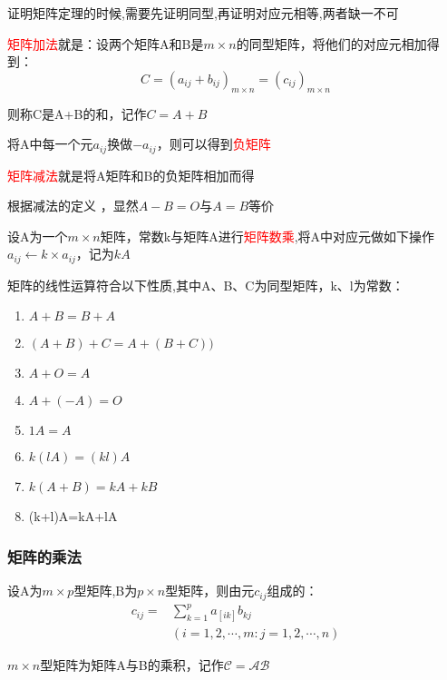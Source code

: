 \begin{note}
	证明矩阵定理的时候,需要先证明同型,再证明对应元相等,两者缺一不可
\end{note}

\begin{definition}
\textcolor{red}{矩阵加法}就是：设两个矩阵A和B是$m\times n$的同型矩阵，将他们的对应元相加得到：
\begin{equation*}
C=(a_{ij}+b_{ij})_{m\times n}=(c_{ij})_{m\times n}
\end{equation*}

则称C是A+B的和，记作$C=A+B$

\end{definition}

将A中每一个元$a_{ij}$换做$-a_{ij}$，则可以得到\textcolor{red}{负矩阵}

\textcolor{red}{矩阵减法}就是将A矩阵和B的负矩阵相加而得

根据减法的定义 ，显然$A-B=O$与$A=B$等价

\begin{definition}
	设A为一个$m\times n$矩阵，常数k与矩阵A进行\textcolor{red}{矩阵数乘},将A中对应元做如下操作$a_{ij}\leftarrow k\times a_{ij}$，记为$kA$
\end{definition}

矩阵的线性运算符合以下性质,其中A、B、C为同型矩阵，k、l为常数：

\begin{enumerate}
	\item {$A+B=B+A$}
	\item {$(A+B)+C=A+(B+C))$}
	\item {$A+O=A$}
	\item {$A+(-A)=O$}
	\item {$1A=A$}
	\item {$k(lA)=(kl)A$}
	\item {$k(A+B)=kA+kB$}
	\item {(k+l)A=kA+lA}
\end{enumerate}

\subsubsection{矩阵的乘法}


\begin{definition}
	设A为$m\times p$型矩阵,B为$p\times n$型矩阵，则由元$c_{ij}$组成的：
	\begin{equation*}
		\begin{aligned}
			c_{ij}=&\sum_{k=1}^{p} a_[ik]b_{kj}\\
			&(i=1,2,\cdots,m:j=1,2,\cdots,n)
		\end{aligned}
	\end{equation*}

	$m\times n$型矩阵为矩阵A与B的乘积，记作$\mathcal{C=AB}$
\end{definition}

